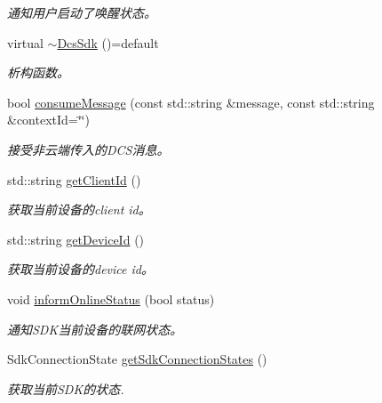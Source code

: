 \begin{DoxyCompactItemize}
\begin{DoxyCompactList}\small\item\em 通知用户启动了唤醒状态。 \end{DoxyCompactList}\item 
\mbox{\label{classduerOSDcsSDK_1_1sdkInterfaces_1_1DcsSdk_a3da5870e20b4cc23bfa5b1b093e4df60}} 
virtual \hyperlink{classduerOSDcsSDK_1_1sdkInterfaces_1_1DcsSdk_a3da5870e20b4cc23bfa5b1b093e4df60}{$\sim$\+Dcs\+Sdk} ()=default
\begin{DoxyCompactList}\small\item\em 析构函数。 \end{DoxyCompactList}\item 
bool \hyperlink{classduerOSDcsSDK_1_1sdkInterfaces_1_1DcsSdk_ac2718d2af3100a8468fcbcf3d581d86d}{consume\+Message} (const std\+::string \&message, const std\+::string \&context\+Id=\char`\"{}\char`\"{})
\begin{DoxyCompactList}\small\item\em 接受非云端传入的\+D\+C\+S消息。 \end{DoxyCompactList}\item 
std\+::string \hyperlink{classduerOSDcsSDK_1_1sdkInterfaces_1_1DcsSdk_ae5e3764fd3aeb840e70c01bbfc2d08b7}{get\+Client\+Id} ()
\begin{DoxyCompactList}\small\item\em 获取当前设备的client id。 \end{DoxyCompactList}\item 
std\+::string \hyperlink{classduerOSDcsSDK_1_1sdkInterfaces_1_1DcsSdk_ac1db2a76291b585655603174cdafdd51}{get\+Device\+Id} ()
\begin{DoxyCompactList}\small\item\em 获取当前设备的device id。 \end{DoxyCompactList}\item 
void \hyperlink{classduerOSDcsSDK_1_1sdkInterfaces_1_1DcsSdk_a18cc9cd0b63fe44ba3b2799fcf6189a4}{inform\+Online\+Status} (bool status)
\begin{DoxyCompactList}\small\item\em 通知\+S\+D\+K当前设备的联网状态。 \end{DoxyCompactList}\item 
Sdk\+Connection\+State \hyperlink{classduerOSDcsSDK_1_1sdkInterfaces_1_1DcsSdk_a14ae84c488947f6ffb189bc2c4f7b405}{get\+Sdk\+Connection\+States} ()
\begin{DoxyCompactList}\small\item\em 获取当前\+S\+D\+K的状态. \end{DoxyCompactList}\item 

\end{DoxyCompactItemize}
